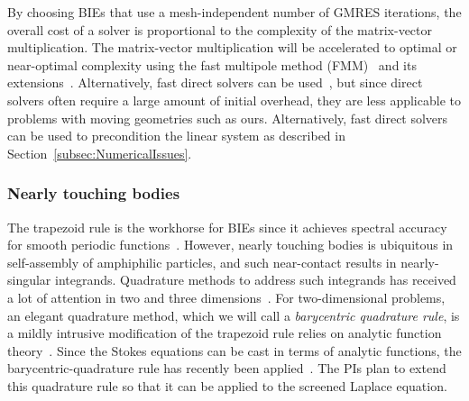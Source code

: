 By choosing BIEs that use a mesh-independent number of GMRES iterations,
the overall cost of a solver is proportional to the complexity of the
matrix-vector multiplication. The matrix-vector multiplication will be
accelerated to optimal or near-optimal complexity using the fast
multipole method (FMM)~\cite{fmm5} and its extensions~\cite{fmm1, fmm2,
fmm3, fmm4, fmm6, fmm7, fmm8}. Alternatively, fast direct solvers can be
used~\cite{fds1, fds2, fds3, fds4, fds5, fds6, fds7, fds8, ho2016cpam2,
ho2016cpam1, minden2016, minden2017siammms}, but since direct solvers
often require a large amount of initial overhead, they are less
applicable to problems with moving geometries such as ours.
Alternatively, fast direct solvers can be used to precondition the
linear system as described in Section~\ref{subsec:NumericalIssues}.

\subsubsection{Nearly touching bodies}
The trapezoid rule is the workhorse for BIEs since it achieves spectral
accuracy for smooth periodic functions~\cite{tre-wei2014}. However,
nearly touching bodies is ubiquitous in self-assembly of amphiphilic
particles, and such near-contact results in  nearly-singular integrands.
Quadrature methods to address such integrands has received a lot of
attention in two and three dimensions~\cite{alpert, kapur, sidi, duffy,
bruno1, bruno2, davis_1984, graglia_2008, hackbusch_sauter_1994,
jarvenpaa_2003, khayat_2005, schwab_1992, ying_2006, beale1, beale2,
goodman_1990, haroldson_1998, lowengrub_1993, schwab_1992, ggq1, ggq2,
ggq3, helsing_2008a, helsing_integral_2009, helsing_tutorial_2012,
klockner2013jcp, qbx2, wala2019jcp, af2018sisc, siegel2018jcp,
rachh2017jcp, ding2019arxiv, bar2014}. For two-dimensional problems, an
elegant quadrature method, which we will call a {\em barycentric
quadrature rule}, is a mildly intrusive modification of the trapezoid
rule relies on analytic function theory~\cite{ioa-pap-per1991}. Since
the Stokes equations can be cast in terms of analytic functions, the
barycentric-quadrature rule has recently been
applied~\cite{bar-wu-vee2015, chi-moo-qua2020}. The PIs plan to extend
this quadrature rule so that it can be applied to the screened Laplace
equation. 





